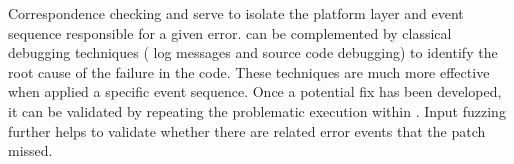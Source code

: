 Correspondence checking and \simulator{} serve to isolate the platform layer and
event sequence responsible for a given error. \projectname{} can be
complemented by classical debugging techniques (\eg{} log messages and source
code debugging) to identify the root cause of
the failure in the code. These techniques are much more
effective when applied a specific event sequence. Once a
potential fix has been developed, it can be validated by repeating the
problematic execution within \projectname{}. Input fuzzing further helps to
validate whether there are
related error events that the patch missed.

